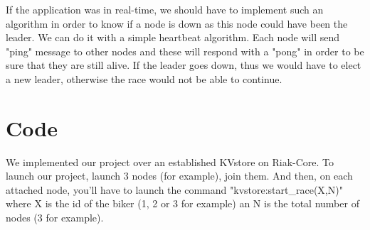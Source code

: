 \documentclass[a4paper, 11pt]{article}
\begin{document}
If the application was in real-time, we should have to implement such an algorithm in order to know if a node is down as this node could have been the leader.
We can do it with a simple heartbeat algorithm. Each node will send "ping" message to other nodes and these will respond with a "pong" in order to be sure that they are still alive. If the leader goes down, thus we would have to elect a new leader, otherwise the race would not be able to continue.

\section{Code}


We implemented our project over an established KVstore on Riak-Core.
To launch our project, launch 3 nodes (for example), join them.
And then, on each attached node, you'll have to launch the command "kvstore:start\_race(X,N)" where X is the id of the biker (1, 2 or 3 for example) an N is the total number of nodes (3 for example).
\end{document}

